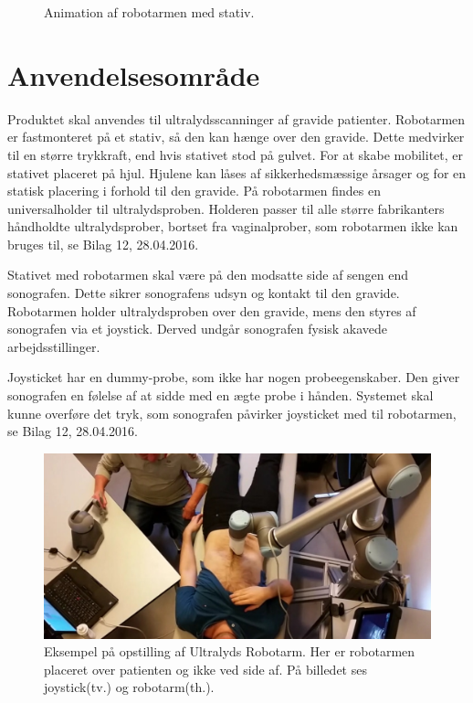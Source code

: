 \begin{figure}[H]
\begin{minipage}{0.55\textwidth}
		\caption{Animation af robotarmen med stativ.}
		\label{Robotstativ}
	\end{minipage}
\end{figure}

\section{Anvendelsesområde}
Produktet skal anvendes til ultralydsscanninger af gravide patienter. Robotarmen er fastmonteret på et stativ, så den kan hænge over den gravide. Dette medvirker til en større trykkraft, end hvis stativet stod på gulvet. For at skabe mobilitet, er stativet placeret på hjul. Hjulene kan låses af sikkerhedsmæssige årsager og for en statisk placering i forhold til den gravide. På robotarmen findes en universalholder til ultralydsproben. Holderen passer til alle større fabrikanters håndholdte ultralydsprober, bortset fra vaginalprober, som robotarmen ikke kan bruges til, se Bilag 12, 28.04.2016.

Stativet med robotarmen skal være på den modsatte side af sengen end sonografen. Dette sikrer sonografens udsyn og kontakt til den gravide. \\
Robotarmen holder ultralydsproben over den gravide, mens den styres af sonografen via et joystick. Derved undgår sonografen fysisk akavede arbejdsstillinger.

Joysticket har en dummy-probe, som ikke har nogen probeegenskaber. Den giver sonografen en følelse af at sidde med en ægte probe i hånden.
Systemet skal kunne overføre det tryk, som sonografen påvirker joysticket med til robotarmen, se Bilag 12, 28.04.2016.
 

\begin{figure}[H]\centering
	\includegraphics[width = 1.0\textwidth]{Figurer/ergonomiskLosning.jpg}
	\caption{Eksempel på opstilling af Ultralyds Robotarm. Her er robotarmen placeret over patienten og ikke ved side af. På billedet ses joystick(tv.) og robotarm(th.).  }
	\label{ergonomiskLosning}
\end{figure}

